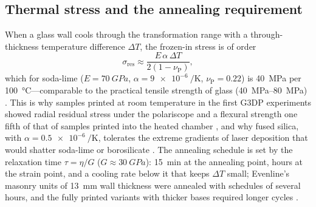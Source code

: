 \subsection{Thermal stress and the annealing requirement}
When a glass wall cools through the transformation range with a through-thickness temperature difference \(\Delta T\), the frozen-in stress is of order
\begin{equation}
  \sigma_{\mathrm{res}} \approx \frac{E\,\alpha\,\Delta T}{2(1-\nu_{\mathrm{P}})},
  \label{eq:stress}
\end{equation}
which for soda-lime (\(E = \SI{70}{GPa}\), \(\alpha = \SI{9e-6}{\per\kelvin}\), \(\nu_{\mathrm{P}} = 0.22\)) is \SI{40}{MPa} per \SI{100}{\celsius}---comparable to the practical tensile strength of glass (\SIrange{40}{80}{MPa}) \citep{inamura2018}. This is why samples printed at room temperature in the first G3DP experiments showed radial residual stress under the polariscope and a flexural strength one fifth of that of samples printed into the heated chamber \citep{klein2015}, and why fused silica, with \(\alpha = \SI{0.5e-6}{\per\kelvin}\), tolerates the extreme gradients of laser deposition that would shatter soda-lime or borosilicate \citep{luo2018quartz,lgd2021coaxial}. The annealing schedule is set by the relaxation time \(\tau = \eta/G\) (\(G \approx \SI{30}{GPa}\)): \SI{15}{min} at the annealing point, hours at the strain point, and a cooling rate below it that keeps \(\Delta T\) small; Evenline's masonry units of \SI{13}{mm} wall thickness were annealed with schedules of several hours, and the fully printed variants with thicker bases required longer cycles \citep{mit2024masonry}.
